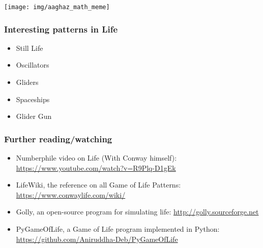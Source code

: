 \documentclass{beamer}
\begin{document}
\begin{frame}
\begin{center}
\texttt{[image: img/aaghaz\_math\_meme]}
\end{center}
\end{frame}

\begin{frame}
\frametitle{Interesting patterns in Life}
\begin{itemize}
\pause
\item{Still Life}
\pause
\item{Oscillators}
\pause
\item{Gliders}
\pause
\item{Spaceships}
\pause
\item{Glider Gun}
\end{itemize}
\end{frame}

\begin{frame}
\frametitle{Further reading/watching}
\begin{itemize}
\item{Numberphile video on Life (With Conway himself): \url{https://www.youtube.com/watch?v=R9Plq-D1gEk}}
\item{LifeWiki, the reference on all Game of Life Patterns: \url{https://www.conwaylife.com/wiki/}}
\item{Golly, an open-source program for simulating life: \url{http://golly.sourceforge.net}}
\item{PyGameOfLife, a Game of Life program implemented in Python: \url{https://github.com/Aniruddha-Deb/PyGameOfLife}}
\end{itemize}
\end{frame}
\end{document}
